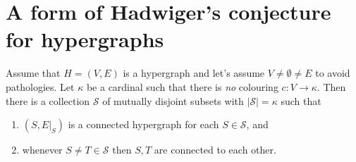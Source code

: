 \documentclass[12pt, a4paper]{amsart}
\begin{document}
\section{A form of Hadwiger's conjecture for hypergraphs}

Assume that $H=(V,E)$ is a hypergraph and let's assume 
$V\neq \emptyset \neq E$ to avoid pathologies. Let $\kappa$ be a
cardinal such that there is {\em no} colouring $c:V\to \kappa$. 
Then there is a collection ${\mathcal S}$ of  mutually
disjoint subsets with $|{\mathcal S}| = \kappa$ such that
\begin{enumerate}
	\item $(S, E|_S)$ is a connected hypergraph for each 
		$S\in {\mathcal S}$, and 
	\item whenever $S\neq T\in {\mathcal S}$ then $S, T$ are connected
	to each other.
\end{enumerate}
\end{document}
